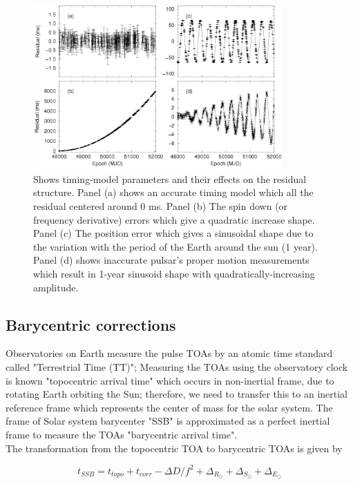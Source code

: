 \begin{figure}[H] 
\centering    
\includegraphics[width=0.85\textwidth]{PSRs_timing_example.png}
\caption[scintilation]{Shows timing-model parameters and their effects on the residual structure. Panel (a) shows an accurate timing model which all the residual centered around 0 ms. Panel (b) The spin down (or frequency derivative) errors which give a quadratic increase shape. Panel (c) The position error which gives a sinusoidal shape due to the variation with the period of the Earth around the sun (1 year). Panel (d) shows inaccurate pulsar's proper motion measurements which result in 1-year sinusoid shape with quadratically-increasing amplitude. \citet{lorimer2005handbook}}
\label{fig:timing model}
\end{figure}


\subsection*{Barycentric corrections}
Observatories on Earth measure the pulse TOAs by an atomic time standard called "Terrestrial Time (TT)"; Measuring the TOAs using the observatory clock is known "topocentric arrival time" which occurs in non-inertial frame, due to rotating Earth orbiting the Sun; therefore, we need to transfer this to an inertial reference frame which represents the center of mass for the solar system. The frame of Solar system barycenter "SSB" is approximated as a perfect inertial frame to measure the TOAs "barycentric arrival time".\\
The transformation from the topocentric TOA to barycentric TOAs is given by 

\begin{equation}
\label{SSB eq}
t_{SSB} = t_{topo} + t_{corr} -  \Delta D/f^2 +  \Delta_{R_{\odot}} +  \Delta_{S_{\odot}} +  \Delta_{E_{\odot}} 
\end{equation}

